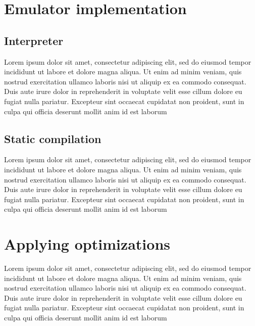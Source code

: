 \section{Emulator implementation}
\label{sec:ch2sec2}

\subsection{Interpreter}
\label{sec:ch2sec2sub1}

\par Lorem ipsum dolor sit amet, consectetur adipiscing elit, sed do eiusmod tempor incididunt ut labore et dolore magna aliqua. Ut enim ad minim veniam, quis nostrud exercitation ullamco laboris nisi ut aliquip ex ea commodo consequat. Duis aute irure dolor in reprehenderit in voluptate velit esse cillum dolore eu fugiat nulla pariatur. Excepteur sint occaecat cupidatat non proident, sunt in culpa qui officia deserunt mollit anim id est laborum

\subsection{Static compilation}
\label{sec:ch2sec2sub2}

\par Lorem ipsum dolor sit amet, consectetur adipiscing elit, sed do eiusmod tempor incididunt ut labore et dolore magna aliqua. Ut enim ad minim veniam, quis nostrud exercitation ullamco laboris nisi ut aliquip ex ea commodo consequat. Duis aute irure dolor in reprehenderit in voluptate velit esse cillum dolore eu fugiat nulla pariatur. Excepteur sint occaecat cupidatat non proident, sunt in culpa qui officia deserunt mollit anim id est laborum

\section{Applying optimizations}
\label{sec:ch2sec3}

\par Lorem ipsum dolor sit amet, consectetur adipiscing elit, sed do eiusmod tempor incididunt ut labore et dolore magna aliqua. Ut enim ad minim veniam, quis nostrud exercitation ullamco laboris nisi ut aliquip ex ea commodo consequat. Duis aute irure dolor in reprehenderit in voluptate velit esse cillum dolore eu fugiat nulla pariatur. Excepteur sint occaecat cupidatat non proident, sunt in culpa qui officia deserunt mollit anim id est laborum

